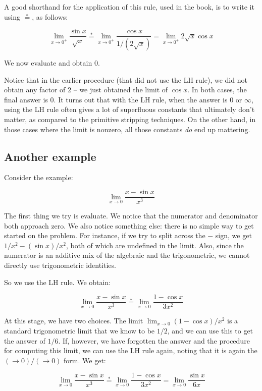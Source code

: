 \documentclass{amsart}
\begin{document}
A good shorthand for the application of this rule, used in the book,
is to write it using $\stackrel{*}{=}$, as follows:

$$\lim_{x \to 0^+} \frac{\sin x}{\sqrt{x}} \stackrel{*}{=} \lim_{x \to 0^+} \frac{\cos x}{1/(2\sqrt{x})} = \lim_{x \to 0^+} 2 \sqrt{x} \cos x$$

We now evaluate and obtain $0$.

Notice that in the earlier procedure (that did not use the LH rule),
we did not obtain any factor of $2$ -- we just obtained the limit of
$\cos x$. In both cases, the final answer is $0$. It turns out that
with the LH rule, when the answer is $0$ or $\infty$, using the LH
rule often gives a lot of superfluous constants that ultimately don't
matter, as compared to the primitive stripping techniques. On the
other hand, in those cases where the limit is nonzero, all those
constants {\em do} end up mattering.

\subsection{Another example}

Consider the example:

$$\lim_{x \to 0} \frac{x - \sin x}{x^3}$$

The first thing we try is evaluate. We notice that the numerator and
denominator both approach zero. We also notice something else: there
is no simple way to get started on the problem. For instance, if we
try to split across the $-$ sign, we get $1/x^2 - (\sin x)/x^2$, both
of which are undefined in the limit. Also, since the numerator is an
additive mix of the algebraic and the trigonometric, we cannot
directly use trigonometric identities.

So we use the LH rule. We obtain:

$$\lim_{x \to 0} \frac{x - \sin x}{x^3} \stackrel{*}{=} \lim_{x \to 0} \frac{1 - \cos x}{3x^2}$$

At this stage, we have two choices. The limit $\lim_{x \to 0} (1 -
\cos x)/x^2$ is a standard trigonometric limit that we know to be
$1/2$, and we can use this to get the answer of $1/6$. If, however, we
have forgotten the answer and the procedure for computing this limit,
we can use the LH rule again, noting that it is again the $(\to
0)/(\to 0)$ form. We get:

$$\lim_{x \to 0} \frac{x - \sin x}{x^3} \stackrel{*}{=} \lim_{x \to 0} \frac{1 - \cos x}{3x^2} = \lim_{x \to 0} \frac{\sin x}{6x}$$
\end{document}
